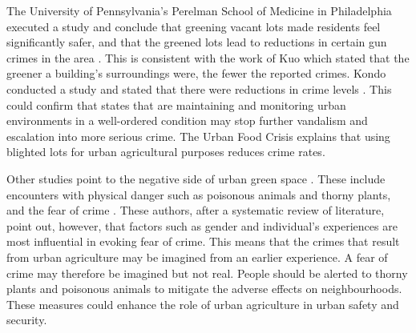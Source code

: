 The University of Pennsylvania's Perelman School of Medicine in Philadelphia executed a study and conclude that greening vacant lots made residents feel significantly safer, and that the greened lots lead to reductions in certain gun crimes in the area \cite{Krauser2012}. This is consistent with the work of Kuo \cite{Kuo2001} which stated that the greener a building's surroundings were, the fewer the reported crimes. Kondo conducted a study and stated that there were reductions in crime levels \cite{Kondo2016}. This could confirm that states that are maintaining and monitoring urban environments in a well-ordered condition may stop further vandalism and escalation into more serious crime. The Urban Food Crisis \cite{TheUrbanFoodCrisis2018} explains that using blighted lots for urban agricultural purposes reduces crime rates.

Other studies point to the negative side of urban green space \cite{Bixler1997}. These include encounters with physical danger such as poisonous animals and thorny plants, and the fear of crime \cite{Sreetheran2014}. These authors, after a systematic review of literature, point out, however, that factors such as gender and individual's experiences are most influential in evoking fear of crime. This means that the crimes that result from urban agriculture may be imagined from an earlier experience. A fear of crime may therefore be imagined but not real. People should be alerted to thorny plants and poisonous animals to mitigate the adverse effects on neighbourhoods. These measures could enhance the role of urban agriculture in urban safety and security.

